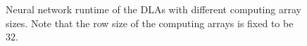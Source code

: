 \begin{figure}
\setlength{\abovecaptionskip}{-2pt}
\setlength{\belowcaptionskip}{-10pt}
    \caption{Neural network runtime of the DLAs with different computing array sizes. Note that the row size of the computing arrays is fixed to be 32.}
\label{fig:model-performance}
\vspace{-1em}
\end{figure}


